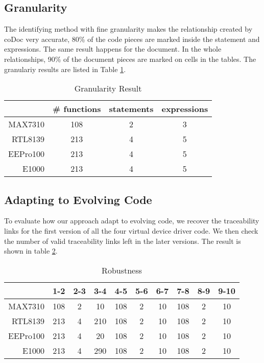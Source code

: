 \subsection{Granularity}

The identifying method with fine granularity makes the relationship created by coDoc very accurate, 
80\% of the code pieces are marked inside the statement and expressions.
The same result happens for the document.
In the whole relationships, 
90\% of the document pieces are marked on cells in the tables.
The granulariy results are listed in Table \ref{table:granularity}.

\begin{table}[th]
\caption{Granularity Result}
\centering
\begin{tabular*}{0.6\textwidth}{@{\extracolsep{\fill}}rccc}
\hline
 & \# functions & statements & expressions \\
\hline
MAX7310 & 108 & 2 & 3\\
RTL8139  & 213 & 4 & 5\\
EEPro100  & 213 & 4 & 5\\
E1000  & 213 & 4 & 5\\
\hline
\end{tabular*}
\label{table:granularity}
\end{table}


\subsection{Adapting to Evolving Code}

To evaluate how our approach adapt to evolving code, we recover the traceability links for the first version of all the four virtual device driver code.
We then check the number of valid traceability links left in the later versions. The result is shown in table \ref{table:robust}.

\begin{table}[th]
\caption{Robustness}
\centering
\begin{tabular*}{0.9\textwidth}{@{\extracolsep{\fill}}rccccccccc}
\hline
 & 1-2 & 2-3 & 3-4 & 4-5 & 5-6 & 6-7 & 7-8 & 8-9 & 9-10 \\
\hline
MAX7310 & 108 & 2 & 10 & 108 & 2 & 10 & 108 & 2 & 10\\
RTL8139  & 213 & 4 & 210 & 108 & 2 & 10 & 108 & 2 & 10\\
EEPro100  & 213 & 4 & 20 & 108 & 2 & 10 & 108 & 2 & 10\\
E1000  & 213 & 4 & 290 & 108 & 2 & 10 & 108 & 2 & 10\\
\hline
\end{tabular*}
\label{table:robust}
\end{table}

